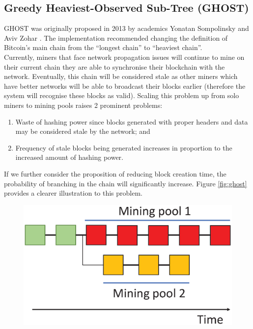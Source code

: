 \documentclass[a4paper,12pt]{article}
\begin{document}
{{	\subsection[Greedy Heaviest-Observed Sub-Tree]{Greedy Heaviest-Observed Sub-Tree (GHOST)}
	\ac{GHOST} was originally proposed in 2013 by academics Yonatan Sompolinsky and Aviv Zohar \cite{bitcoinghost}. The implementation recommended changing the definition of Bitcoin's main chain from the ``longest chain'' to ``heaviest chain''.\\\newline
	Currently, miners that face network propagation issues will continue to mine on their current chain they are able to synchronise their blockchain with the network. Eventually, this chain will be considered stale as other miners which have better networks will be able to broadcast their blocks earlier (therefore the system will recognise these blocks as valid). Scaling this problem up from solo miners to mining pools raises 2 prominent problems:
	\begin{enumerate}
		\item Waste of hashing power since blocks generated with proper headers and data may be considered stale by the network; and
		\item Frequency of stale blocks being generated increases in proportion to the increased amount of hashing power.
	\end{enumerate}
If we further consider the proposition of reducing block creation time, the probability of branching in the chain will significantly increase. Figure \ref{fig:ghost} provides a clearer illustration to this problem.\\\newline
\begin{minipage}{.45\textwidth}
\begin{figure}[H]
	\centering
	\includegraphics[width=1\linewidth]{ghost}

\end{figure}
\end{minipage}}}
\end{document}

